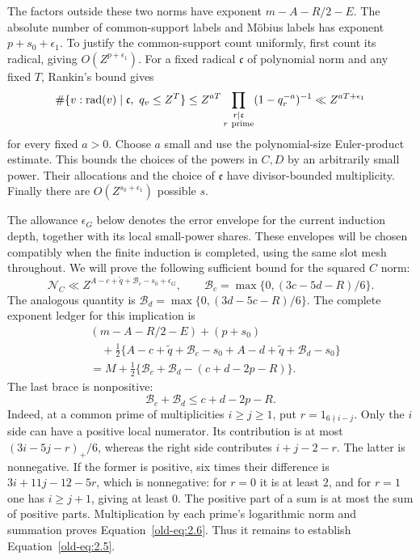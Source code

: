 \documentclass[11pt,a4paper]{article}
\numberwithin{equation}{section}
\numberwithin{figure}{section}
\theoremstyle{definition}
\theoremstyle{remark}
\begin{document}
The factors outside these two norms have exponent
\(m-A-R/2-E\).  The absolute number of common-support labels and
M\"obius labels has exponent \(p+s_0+\epsilon_1\).  To justify
the common-support count uniformly, first count its radical, giving
\(O(Z^{p+\epsilon_1})\).  For a fixed radical \(\mathfrak c\) of
polynomial norm and any fixed \(T\), Rankin's bound gives
\[
 \#\{v:\operatorname{rad}(v)\mid\mathfrak c,\ q_v\le Z^T\}
 \le Z^{aT}\prod_{\substack{r\mid\mathfrak c\\r\ {\rm prime}}}
             (1-q_r^{-a})^{-1}
 \ll Z^{aT+\epsilon_1}
\]
for every fixed \(a>0\).  Choose \(a\) small and use the
polynomial-size Euler-product estimate.  This bounds the choices of
the powers in \(C,D\) by an arbitrarily small power.  Their
allocations and the choice of \(\mathfrak e\) have divisor-bounded
multiplicity.  Finally there are \(O(Z^{s_0+\epsilon_1})\)
possible \(s\).

The allowance \(\epsilon_G\) below denotes the error envelope for the
current induction depth, together with its local small-power shares.
These envelopes will be chosen compatibly when the finite induction is
completed, using the same slot mesh throughout.
We will prove the following sufficient bound for the squared \(C\)
norm:
\begin{equation}
 \mathcal N_C\ll
 Z^{A-c+\widetilde q+\mathcal B_c-s_0+\epsilon_G},
 \qquad
 \mathcal B_c=\max\{0,(3c-5d-R)/6\}.
 \label{old-eq:2.5}
\end{equation}
The analogous quantity is
\(\mathcal B_d=\max\{0,(3d-5c-R)/6\}\).
The complete exponent ledger for this implication is
\[
 \begin{aligned}
 &(m-A-R/2-E)+(p+s_0)\\
 &\quad+\tfrac12\{A-c+\widetilde q+\mathcal B_c-s_0
                  +A-d+\widetilde q+\mathcal B_d-s_0\}\\
 &=M+\tfrac12\{\mathcal B_c+\mathcal B_d-(c+d-2p-R)\}.
 \end{aligned}
\]
The last brace is nonpositive:
\begin{equation}
 \mathcal B_c+\mathcal B_d\le c+d-2p-R.
 \label{old-eq:2.6}
\end{equation}
Indeed, at a common prime of multiplicities \(i\ge j\ge1\), put
\(r=1_{6\nmid i-j}\).  Only the \(i\) side can have a positive
local numerator.  Its contribution is at most
\((3i-5j-r)_+/6\), whereas the right side contributes
\(i+j-2-r\).  The latter is nonnegative.  If the former is
positive, six times their difference is
\(3i+11j-12-5r\), which is nonnegative: for \(r=0\) it is at
least \(2\), and for \(r=1\) one has \(i\ge j+1\), giving at
least \(0\).  The positive part of a sum is at most the sum of
positive parts.  Multiplication by each prime's logarithmic norm
and summation proves Equation~\eqref{old-eq:2.6}.  Thus it remains
to establish Equation~\eqref{old-eq:2.5}.
\end{document}
